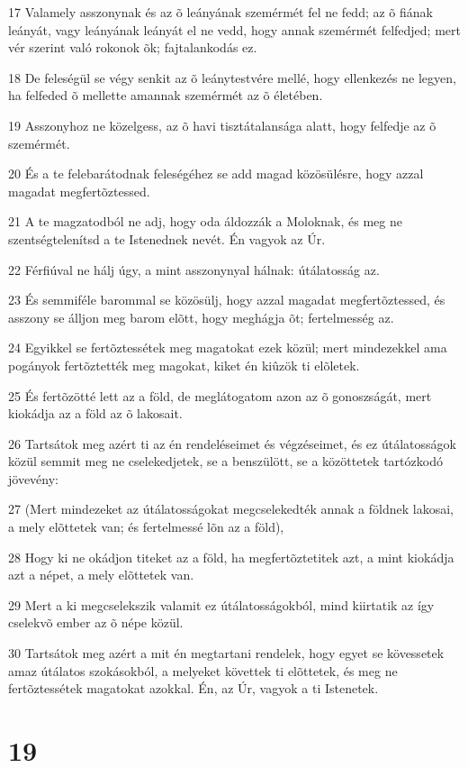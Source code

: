 \par 17 Valamely asszonynak és az õ leányának szemérmét fel ne fedd; az õ fiának leányát, vagy leányának leányát el ne vedd, hogy annak szemérmét felfedjed; mert vér szerint való rokonok õk; fajtalankodás ez.
\par 18 De feleségül se végy senkit az õ leánytestvére mellé, hogy ellenkezés ne legyen, ha felfeded õ mellette amannak szemérmét az õ életében.
\par 19 Asszonyhoz ne közelgess, az õ havi tisztátalansága alatt, hogy felfedje az õ szemérmét.
\par 20 És a te felebarátodnak feleségéhez se add magad közösülésre, hogy azzal magadat megfertõztessed.
\par 21 A te magzatodból ne adj, hogy oda áldozzák a Moloknak, és meg ne szentségtelenítsd a te Istenednek nevét. Én vagyok az Úr.
\par 22 Férfiúval ne hálj úgy, a mint asszonynyal hálnak: útálatosság az.
\par 23 És semmiféle barommal se közösülj, hogy azzal magadat megfertõztessed, és asszony se álljon meg barom elõtt, hogy meghágja õt; fertelmesség az.
\par 24 Egyikkel se fertõztessétek meg magatokat ezek közül; mert mindezekkel ama pogányok fertõztették meg magokat, kiket én kiûzök ti elõletek.
\par 25 És fertõzötté lett az a föld, de meglátogatom azon az õ gonoszságát, mert kiokádja az a föld az õ lakosait.
\par 26 Tartsátok meg azért ti az én rendeléseimet és végzéseimet, és ez útálatosságok közül semmit meg ne cselekedjetek, se a benszülött, se a közöttetek tartózkodó jövevény:
\par 27 (Mert mindezeket az útálatosságokat megcselekedték annak a földnek lakosai, a mely elõttetek van; és fertelmessé lõn az a föld),
\par 28 Hogy ki ne okádjon titeket az a föld, ha megfertõztetitek azt, a mint kiokádja azt a népet, a mely elõttetek van.
\par 29 Mert a ki megcselekszik valamit ez útálatosságokból, mind kiirtatik az így cselekvõ ember az õ népe közül.
\par 30 Tartsátok meg azért a mit én megtartani rendelek, hogy egyet se kövessetek amaz útálatos szokásokból, a melyeket követtek ti elõttetek, és meg ne fertõztessétek magatokat azokkal. Én, az Úr, vagyok a ti Istenetek.

\chapter{19}

